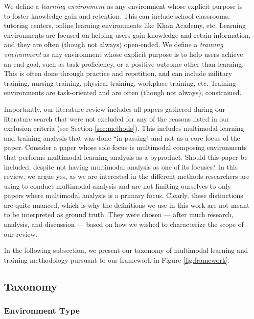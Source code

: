 \documentclass[manuscript,screen,review]{acmart}
\begin{document}
We define a \textit{learning environment} as any environment whose explicit purpose is to foster knowledge gain and retention. This can include school classrooms, tutoring centers, online learning environments like Khan Academy, etc. Learning environments are focused on helping users gain knowledge and retain information, and they are often (though not always) open-ended. We define a \textit{training environment} as any environment whose explicit purpose is to help users achieve an end goal, such as task-proficiency, or a positive outcome other than learning. This is often done through practice and repetition, and can include military training, nursing training, physical training, workplace training, etc. Training environments are task-oriented and are often (though not always), constrained. 

Importantly, our literature review includes all papers gathered during our literature search that were not excluded for any of the reasons listed in our exclusion criteria (see Section \ref{sec:methods}). This includes multimodal learning and training analysis that was done ``in passing" and not as a core focus of the paper. Consider a paper whose sole focus is multimodal composing environments that performs multimodal learning analysis as a byproduct. Should this paper be included, despite not having multimodal analysis as one of its focuses? In this review, we argue yes, as we are interested in the different methods researchers are using to conduct multimodal analysis and are not limiting ourselves to only papers where multimodal analysis is a primary focus. Clearly, these distinctions are quite nuanced, which is why the definitions we use in this work are not meant to be interpreted as ground truth. They were chosen --- after much research, analysis, and discussion --- based on how we wished to characterize the scope of our review.

In the following subsection, we present our taxonomy of multimodal learning and training methodology pursuant to our framework in Figure \ref{fig:framework}. 

\subsection{Taxonomy}\label{subsec:taxonomy}
\subsubsection{Environment Type}\label{subsec:environment_type} %
\end{document}
